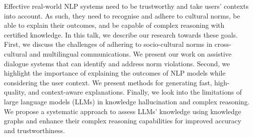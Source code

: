 Effective real-world NLP systems need to be trustworthy and take users’ contexts into account. As such, they need to recognise and adhere to cultural norms, be able to explain their outcomes, and be capable of complex reasoning with certified knowledge. In this talk, we describe our research towards these goals. First, we discuss the challenges of adhering to socio-cultural norms in cross-cultural and multilingual communications. We present our work on assistive dialogue systems that can identify and address norm violations. Second, we highlight the importance of explaining the outcomes of NLP models while considering the user context. We present methods for generating fast, high-quality, and context-aware explanations. Finally, we look into the limitations of large language models (LLMs) in knowledge hallucination and complex reasoning. We propose a systematic approach to assess LLMs’ knowledge using knowledge graphs and enhance their complex reasoning capabilities for improved accuracy and trustworthiness.
